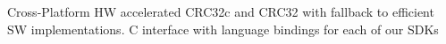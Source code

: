 Cross-\/\+Platform HW accelerated CRC32c and CRC32 with fallback to efficient SW implementations. C interface with language bindings for each of our SDKs 